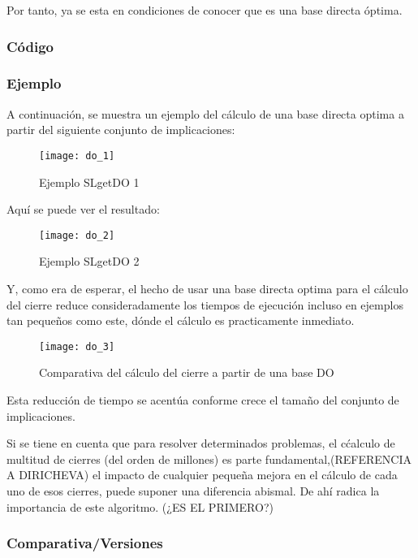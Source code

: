 Por tanto, ya se esta en condiciones de conocer que es una base directa \'optima.
\newpage
\subsubsection{C\'odigo} 

\newpage
\subsubsection{Ejemplo} 
A continuaci\'on, se muestra un ejemplo del c\'alculo de una base directa optima a partir del siguiente conjunto de implicaciones: 
\begin{figure}[H]
    \centering
    \texttt{[image: do\_1]}
    \caption{Ejemplo SLgetDO 1}
    \label{fig:do_1}
\end{figure} 

Aqu\'i se puede ver el resultado:
\begin{figure}[H]
    \centering
    \texttt{[image: do\_2]}
    \caption{Ejemplo SLgetDO 2}
    \label{fig:do_2}
\end{figure} 
Y, como era de esperar, el hecho de usar una base directa optima para el c\'alculo del cierre reduce consideradamente los tiempos de ejecuci\'on incluso en ejemplos tan peque\~nos como este, d\'onde el c\'alculo es practicamente inmediato.
\begin{figure}[H]
    \centering
    \texttt{[image: do\_3]}
    \caption{Comparativa del c\'alculo del cierre a partir de una base DO}
    \label{fig:do_3}
\end{figure} 

Esta reducci\'on de tiempo se acent\'ua conforme crece el tama\~no del conjunto de implicaciones.

Si se tiene en cuenta que para resolver determinados problemas, el c\'calculo de multitud de cierres (del orden de millones) es parte fundamental,(REFERENCIA A DIRICHEVA) el impacto de cualquier peque\~na mejora en el c\'alculo de cada uno de esos cierres, puede suponer una diferencia abismal. De ah\'i radica la importancia de este algoritmo.
(¿ES EL PRIMERO?)
\subsubsection{Comparativa/Versiones} 